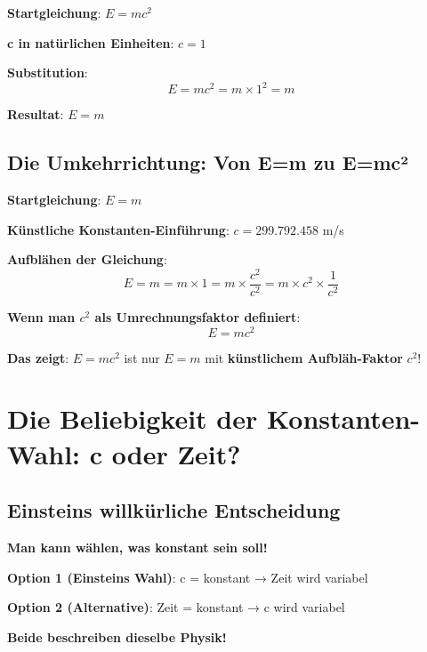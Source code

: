 \documentclass[12pt,a4paper]{article}
\begin{document}
	\textbf{Startgleichung}: $E = mc^2$
	
	\textbf{c in natürlichen Einheiten}: $c = 1$
	
	\textbf{Substitution}:
	\begin{equation}
		E = mc^2 = m \times 1^2 = m
	\end{equation}
	
	\textbf{Resultat}: $E = m$
	
	\subsection{Die Umkehrrichtung: Von E=m zu E=mc²}
	
	\textbf{Startgleichung}: $E = m$
	
	\textbf{Künstliche Konstanten-Einführung}: $c = 299.792.458$ m/s
	
	\textbf{Aufblähen der Gleichung}:
	\begin{equation}
		E = m = m \times 1 = m \times \frac{c^2}{c^2} = m \times c^2 \times \frac{1}{c^2}
	\end{equation}
	
	\textbf{Wenn man $c^2$ als Umrechnungsfaktor definiert}:
	\begin{equation}
		E = mc^2
	\end{equation}
	
	\textbf{Das zeigt}: $E = mc^2$ ist nur $E = m$ mit \textbf{künstlichem Aufbläh-Faktor} $c^2$!
	
	\section{Die Beliebigkeit der Konstanten-Wahl: c oder Zeit?}
	
	\subsection{Einsteins willkürliche Entscheidung}
	
	\begin{tcolorbox}[colback=orange!5!white,colframe=orange!75!black,title=Die fundamentale Wahlmöglichkeit]
		\textbf{Man kann wählen, was konstant sein soll!}
		
		\textbf{Option 1 (Einsteins Wahl)}: c = konstant → Zeit wird variabel
		
		\textbf{Option 2 (Alternative)}: Zeit = konstant → c wird variabel
		
		\textbf{Beide beschreiben dieselbe Physik!}
	\end{tcolorbox}
	
\end{document}

